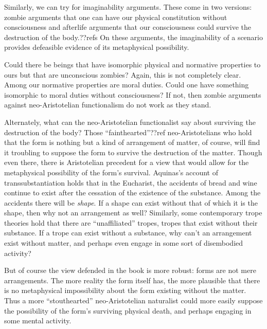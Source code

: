 Similarly, we can try for imaginability arguments. These come in two versions: zombie arguments that one can have our physical
constitution without consciousness and afterlife arguments that our consciousness could survive the destruction of the body.??refs
On these arguments, the imaginability of a scenario provides defeasible evidence of its metaphysical possibility. 

Could there be beings that have isomorphic physical and normative properties to ours
but that are unconscious zombies? Again, this is not completely clear. Among our normative properties are moral duties. Could one
have something isomorphic to moral duties without consciousness? If not, then zombie arguments against neo-Aristotelian functionalism 
do not work as they stand. 

Alternately, what can the neo-Aristotelian functionalist say about surviving the destruction of the body? Those ``fainthearted''??ref
neo-Aristotelians who hold that the form is nothing but a kind of arrangement of matter, of course, will find it troubling to
suppose the form to survive the destruction of the matter. Though even there, there is Aristotelian precedent for a view
that would allow for the metaphysical possibility of the form's survival. Aquinas's account of transsubstantiation holds that in the Eucharist, the accidents of
bread and wine continue to exist after the cessation of the existence of the substance. Among the accidents there will be 
\textit{shape}. If a shape can exist without that of which it is the shape, then why not an arrangement as well? Similarly,
some contemporary trope theories hold that there are ``unaffiliated'' tropes, tropes that exist without their substance. If a 
trope can exist without a substance, why can't an arrangement exist without matter, and perhaps even engage in some
sort of disembodied activity? 

But of course the view defended in the book is more robust: forms are not mere arrangements. The more reality the form itself
has, the more plausible that there is no metaphysical impossibility about the form existing without the matter. 
Thus a more ``stouthearted'' neo-Aristotelian naturalist could more easily suppose the possibility of the form's
surviving physical death, and perhaps engaging in some mental activity.

